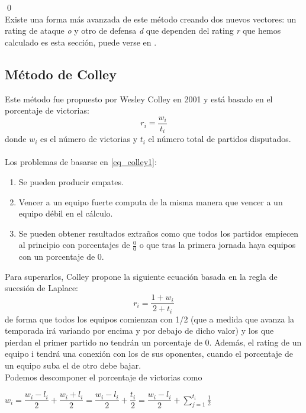 \qed
\ \\
Existe una forma más avanzada de este método creando dos nuevos vectores: un rating de ataque \textit{o} y otro de defensa \textit{d} que dependen del rating \textit{r} que hemos calculado es esta sección, puede verse en \cite[pág 11-13]{cap2}.\\

\subsection{Método de Colley}
Este método fue propuesto por Wesley Colley en 2001 y está basado en el porcentaje de victorias:\\
\begin{equation} \label{eq_colley1}
	r_{i} = \dfrac{w_{i}}{t_{i}}
\end{equation}
donde $w_{i}$ es el número de victorias y $t_{i}$ el número total de partidos disputados.\\
\\
Los problemas de basarse en \ref{eq_colley1}:
\begin{enumerate}
	\item Se pueden producir empates.
	\item Vencer a un equipo fuerte computa de la misma manera que vencer a un equipo débil en el cálculo.
	\item Se pueden obtener resultados extraños como que todos los partidos empiecen al principio con porcentajes de $\frac{0}{0}$ o que tras la primera jornada haya equipos con un porcentaje de 0.  
\end{enumerate}
Para superarlos, Colley propone la siguiente ecuación basada en la regla de sucesión de Laplace:
\begin{equation} \label{eq2.5}
	r_{i} = \dfrac{1+w_{i}}{2+t_{i}}
\end{equation}
de forma que todos los equipos comienzan con 1/2 (que a medida que avanza la temporada irá variando por encima y por debajo de dicho valor) y los que pierdan el primer partido no tendrán un porcentaje de 0. Además, el rating de un equipo i tendrá una conexión con los de sus oponentes, cuando el porcentaje de un equipo suba el de otro debe bajar.\\
Podemos descomponer el porcentaje de victorias como
\begin{center} 
	$ w_{i} = \dfrac{w_{i}-l_{i}}{2} + \dfrac{w_{i}+l_{i}}{2} = \dfrac{w_{i}-l_{i}}{2} + \dfrac{t_{i}}{2} = \dfrac{w_{i}-l_{i}}{2} + \sum\limits_{j=1}^{t_{i}} \frac{1}{2} $
\end{center}
